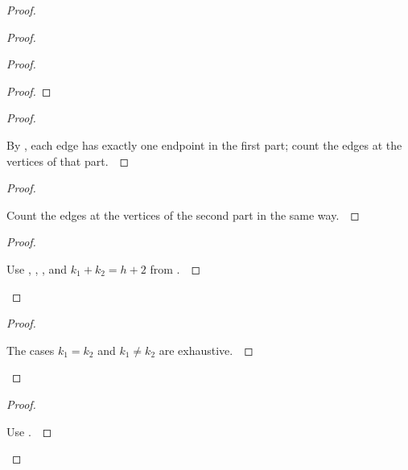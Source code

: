 \documentclass[11pt]{amsart}
\let\qed\relax
\theoremstyle{definition}
\begin{document}
\begin{proof}
\begin{proof}
\begin{proof}
\begin{proof}
\end{proof}
\begin{proof}
\pf\ \raggedright By , each edge has exactly one endpoint in the first part; count the edges at the vertices of that part.~\qed
\end{proof}
\begin{proof}
\pf\ \raggedright Count the edges at the vertices of the second part in the same way.~\qed
\end{proof}
\qedstep
\begin{proof}
\pf\ \raggedright Use , , , and $k_1+k_2=h+2$ from .~\qed
\end{proof}
\end{proof}
\qedstep
\begin{proof}
\pf\ \raggedright The cases $k_1=k_2$ and $k_1\ne k_2$ are exhaustive.~\qed
\end{proof}
\end{proof}
\qedstep
\begin{proof}
\pf\ \raggedright Use .~\qed
\end{proof}
\end{proof}
\end{document}
